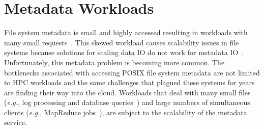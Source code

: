 
\section{Metadata Workloads}

File system metadata is small and highly accessed resulting in workloads with
many small requests~\cite{roselli:atec2000-FS-workloads, abad:ucc2012-mimesis}.
This skewed workload causes scalability issues in file systems because
solutions for scaling data IO do not work for metadata
IO~\cite{roselli:atec2000-FS-workloads, abad:techreport2012-fstrace,
alam:pdsw2011-metadata-scaling, weil:osdi2006-ceph}.  Unfortunately, this
metadata problem is becoming more common. The bottlenecks associated with
accessing POSIX file system metadata are not limited to HPC workloads and the
same challenges that plagued these systems for years are finding their way into
the cloud. Workloads that deal with many small files ({\it e.g.}, log
processing and database
queries~\cite{thusoo:sigmod2010-facebook-infrastructure}) and large numbers of
simultaneous clients ({\it e.g.}, MapReduce
jobs~\cite{mckusick:acm2010-gfs-evolution}), are subject to the scalability of
the metadata service. 

